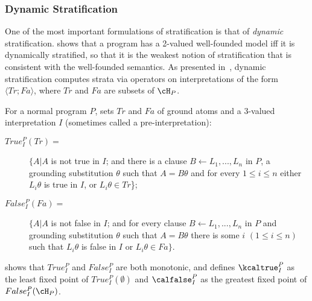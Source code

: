 \subsubsection{Dynamic Stratification} \label{dyn-strat}

One of the most important formulations of stratification is that of
{\em dynamic} stratification.  \cite{Przy89d} shows that a program has
a 2-valued well-founded model iff it is dynamically stratified, so
that it is the weakest notion of stratification that is consistent
with the well-founded semantics.
%
As presented in~\cite{Przy89d}, dynamic stratification computes strata
via operators on interpretations of the form $\langle Tr;Fa \rangle$,
where $Tr$ and $Fa$ are subsets of $\cH_P$.
%
\begin{definition} \label{def:dyn-ops}
For a normal program $P$, sets $Tr$ and $Fa$ of ground atoms and a
3-valued interpretation $I$ (sometimes called a pre-interpretation):
\begin{description} \item[$True^P_I(Tr) =$]
    $\{A|A$ is not true in $I$;  and 
                        there is a clause
                        $B \leftarrow L_1,...,L_n$
                in $P$, a grounding substitution $\theta$ such that
                $A = B\theta$ and for every $1 \leq i \leq n$ either
                $L_i\theta$ is true in $I$, or $L_i\theta \in Tr$\};
  \item[$False^P_I(Fa) =$] 
$\{A|A$ is not false in $I$; and for every
    clause $B \leftarrow L_1,...,L_n$ in $P$ and grounding substitution
    $\theta$ such that $A = B\theta$ there is some $i$ $(1 \leq i \leq
    n)$ such that $L_i\theta$ is false in $I$ or $L_i\theta \in Fa\}$.
\end{description}
\end{definition}
%
\cite{Przy89d} shows that $True^P_I$ and $False^P_I$ are both
monotonic, and defines $\kcaltrue^P_I$ as the least fixed point of $True^P_I(\emptyset)$
and $\calfalse^P_I$ as the greatest fixed point of
$False^P_I(\cH_P)$.
